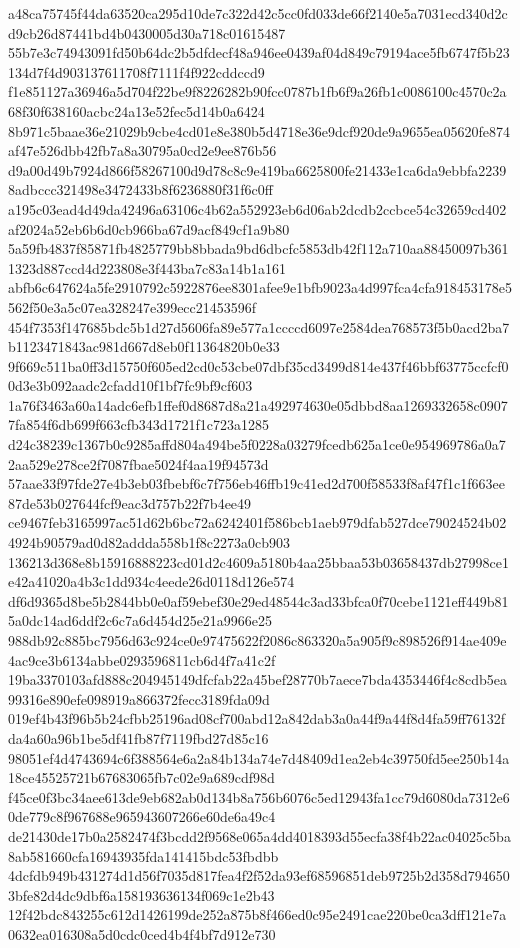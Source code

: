 \documentclass[11pt,a4paper]{article}
\begin{document}
{a48ca75745f44da63520ca295d10de7c322d42c5cc0fd033de66f2140e5a7031ecd340d2cd9cb26d87441bd4b0430005d30a718c01615487
55b7e3c74943091fd50b64dc2b5dfdecf48a946ee0439af04d849c79194ace5fb6747f5b23134d7f4d903137611708f7111f4f922cddccd9
f1e851127a36946a5d704f22be9f8226282b90fcc0787b1fb6f9a26fb1c0086100c4570c2a68f30f638160acbc24a13e52fec5d14b0a6424
8b971c5baae36e21029b9cbe4cd01e8e380b5d4718e36e9dcf920de9a9655ea05620fe874af47e526dbb42fb7a8a30795a0cd2e9ee876b56
d9a00d49b7924d866f58267100d9d78c8c9e419ba6625800fe21433e1ca6da9ebbfa22398adbccc321498e3472433b8f6236880f31f6c0ff
a195c03ead4d49da42496a63106c4b62a552923eb6d06ab2dcdb2ccbce54c32659cd402af2024a52eb6b6d0cb966ba67d9acf849cf1a9b80
5a59fb4837f85871fb4825779bb8bbada9bd6dbcfc5853db42f112a710aa88450097b3611323d887ccd4d223808e3f443ba7c83a14b1a161
abfb6c647624a5fe2910792c5922876ee8301afee9e1bfb9023a4d997fca4cfa918453178e5562f50e3a5c07ea328247e399ecc21453596f
454f7353f147685bdc5b1d27d5606fa89e577a1ccccd6097e2584dea768573f5b0acd2ba7b1123471843ac981d667d8eb0f11364820b0e33
9f669c511ba0ff3d15750f605ed2cd0c53cbe07dbf35cd3499d814e437f46bbf63775ccfcf00d3e3b092aadc2cfadd10f1bf7fc9bf9cf603
1a76f3463a60a14adc6efb1ffef0d8687d8a21a492974630e05dbbd8aa1269332658c09077fa854f6db699f663cfb343d1721f1c723a1285
d24c38239c1367b0c9285affd804a494be5f0228a03279fcedb625a1ce0e954969786a0a72aa529e278ce2f7087fbae5024f4aa19f94573d
57aae33f97fde27e4b3eb03fbebf6c7f756eb46ffb19c41ed2d700f58533f8af47f1c1f663ee87de53b027644fcf9eac3d757b22f7b4ee49
ce9467feb3165997ac51d62b6bc72a6242401f586bcb1aeb979dfab527dce79024524b024924b90579ad0d82addda558b1f8c2273a0cb903
136213d368e8b15916888223cd01d2c4609a5180b4aa25bbaa53b03658437db27998ce1e42a41020a4b3c1dd934c4eede26d0118d126e574
df6d9365d8be5b2844bb0e0af59ebef30e29ed48544c3ad33bfca0f70cebe1121eff449b815a0dc14ad6ddf2c6c7a6d454d25e21a9966e25
988db92c885bc7956d63c924ce0e97475622f2086c863320a5a905f9c898526f914ae409e4ac9ce3b6134abbe0293596811cb6d4f7a41c2f
19ba3370103afd888c204945149dfcfab22a45bef28770b7aece7bda4353446f4c8cdb5ea99316e890efe098919a866372fecc3189fda09d
019ef4b43f96b5b24cfbb25196ad08cf700abd12a842dab3a0a44f9a44f8d4fa59ff76132fda4a60a96b1be5df41fb87f7119fbd27d85c16
98051ef4d4743694c6f388564e6a2a84b134a74e7d48409d1ea2eb4c39750fd5ee250b14a18ce45525721b67683065fb7c02e9a689cdf98d
f45ce0f3bc34aee613de9eb682ab0d134b8a756b6076c5ed12943fa1cc79d6080da7312e60de779c8f967688e965943607266e60de6a49c4
de21430de17b0a2582474f3bcdd2f9568e065a4dd4018393d55ecfa38f4b22ac04025c5ba8ab581660cfa16943935fda141415bdc53fbdbb
4dcfdb949b431274d1d56f7035d817fea4f2f52da93ef68596851deb9725b2d358d7946503bfe82d4dc9dbf6a158193636134f069c1e2b43
12f42bdc843255c612d1426199de252a875b8f466ed0c95e2491cae220be0ca3dff121e7a0632ea016308a5d0cdc0ced4b4f4bf7d912e730
}
\end{document}
